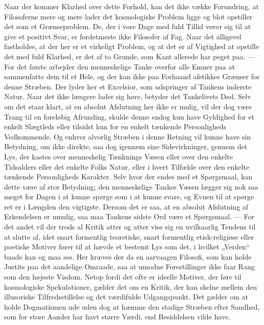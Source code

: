 \documentclass[12pt,a4paper,openany]{book}
\newcommand{\opage}[1]{\marginnote{\footnotesize\textit{[#1]}}}
\begin{document}
Naar der kommer Klarhed over dette Forhold, kan det ikke vække
Forundring, at Filosoferne mere og mere lader det kosmologiske
Problem ligge og blot opstiller det som et Grænseproblem. De, der i
vore Dage med fuld Tillid vover sig til at give et positivt Svar, er
fordetmeste ikke Filosofer af Fag. Naar det alligevel fastholdes, at
der her er et virkeligt Problem, og at det er af Vigtighed at opstille
det med fuld Klarhed, er det af to Grunde, som Kant allerede har
peget paa. --- For det første arbejder den menneskelige Tanke overfor
alle Emner paa at sammenfatte dem til et Hele, og der kan ikke
paa Forhaand afstikkes Grænser for denne Stræben. Der lyder her
et Excelsior, som udspringer af Tankens inderste Natur. Naar det
ikke længere lader sig høre, betyder det Tankelivets Død. Selv om
det staar klart, at en absolut Afslutning her ikke er mulig, vil der
dog være Trang til en foreløbig Afrunding, skulde denne endog kun
have Gyldighed for et enkelt Slægtleds eller tilsidst kun for en enkelt
tænkende Personligheds Vedkommende. Og enhver alvorlig Stræben
i denne Retning vil kunne have sin Betydning, om ikke direkte, saa
dog igennem sine Sidevirkninger, gennem det Lys, der kastes over
menneskelig Tænknings Væsen eller over den enkelte Tidsalders
eller det enkelte Folks Natur, eller i hvert Tilfælde over den enkelte
\opage{85}tænkende Personligheds Karakter. Selv hvor der endes med et Spørgsmaal,
kan dette være af stor Betydning; den menneskelige Tankes
Væsen lægger sig nok saa meget for Dagen i at kunne spørge som i
at kunne svare, og Evnen til at spørge ret er i Længden den vigtigste.
Dersom det er saa, at en absolut Afslutning af Erkendelsen er umulig, saa maa Tankens sidste Ord være et Spørgsmaal. --- For det
andet vil der trods al Kritik atter og atter vise sig en uvilkaarlig
Tendens til at slutte af, idet snart formentlig teoretiske, snart formentlig
etisk-religiøse eller poetiske Motiver fører til at hævde et
bestemt Lys som det, i hvilket „Verden“ baade kan og maa ses. Her
kræves der da en aarvaagen Filosofi, som kan holde Justits paa det
aandelige Omraade, saa at umodne Forestillinger ikke faar Rang
som den højeste Visdom. Netop fordi det ofte er ideelle Motiver, der
føre til kosmologiske Spekulationer, gælder det om en Kritik, der
kan skelne mellem den illusoriske Tilfredsstillelse og det værdifulde
Udgangspunkt. Det gælder om at holde Dogmatismen ude uden dog
at hæmme den stadige Stræben efter Sandhed, som for store Aander
har havt større Værdi, end Besiddelsen vilde have.
\end{document}
